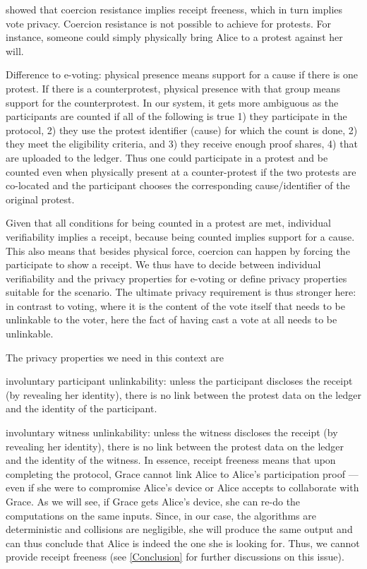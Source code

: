  showed that coercion resistance implies receipt freeness, which in turn implies vote privacy.
Coercion resistance is not possible to achieve for protests.
For instance, someone could simply physically bring Alice to a protest against her will.

Difference to e-voting:
physical presence means support for a cause if there is one protest. If there is a counterprotest, physical presence with that group means support for the counterprotest. In our system, it gets more ambiguous as the participants are counted if all of the following is true 1) they participate in the protocol, 2) they use the protest identifier (cause) for which the count is done, 2) they meet the eligibility criteria, and 3) they receive enough proof shares, 4) that are uploaded to the ledger. Thus one could participate in a protest and be counted even when physically present at a counter-protest if the two protests are co-located and the participant chooses the corresponding cause/identifier of the original protest.

Given that all conditions for being counted in a protest are met, individual verifiability implies a receipt, because being counted implies support for a cause. This also means that besides physical force, coercion can happen by forcing the participate to show a receipt. We thus have to decide between individual verifiability and the privacy properties for e-voting or define privacy properties suitable for the scenario. The ultimate privacy requirement is thus stronger here: in contrast to voting, where it is the content of the vote itself that needs to be unlinkable to the voter, here the fact of having cast a vote at all needs to be unlinkable.

The privacy properties we need in this context are

involuntary participant unlinkability: unless the participant discloses the receipt (by revealing her identity), there is no link between the protest data on the ledger and the identity of the participant.

involuntary witness unlinkability: unless the witness discloses the receipt (by revealing her identity), there is no link between the protest data on the ledger and the identity of the witness.
In essence, receipt freeness means that upon completing the protocol, Grace cannot link Alice to Alice's participation proof --- even if she were to compromise Alice's device or Alice accepts to collaborate with Grace.
As we will see, if Grace gets Alice's device, she can re-do the computations on the same inputs.
Since, in our case, the algorithms are deterministic and collisions are negligible, she will produce the same output and can thus conclude that Alice is indeed the one she is looking for.
Thus, we cannot provide receipt freeness (see \cref{Conclusion} for further discussions on this issue).

